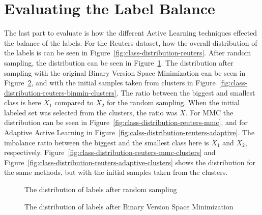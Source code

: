 \section{Evaluating the Label Balance}

The last part to evaluate is how the different Active Learning techniques effected the balance of the labels.
For the Reuters dataset, how the overall distribution of the labels is can be seen in Figure~\ref{fig:class-distribution-reuters}.
After random sampling, the distribution can be seen in Figure~\ref{fig:class-distribution-reuters-random}.
The distribution after sampling with the original Binary Version Space Minimization can be seen in Figure~\ref{fig:class-distribution-reuters-binmin}, and with the initial samples taken from clusters in Figure~\ref{fig:class-distribution-reuters-binmin-clusters}.
The ratio between the biggest and smallest class is here $X_1$ compared to $X_2$ for the random sampling.
When the initial labeled set was selected from the clusters, the ratio was $X$.
For MMC the distribution can be seen in Figure~\ref{fig:class-distribution-reuters-mmc}, and for Adaptive Active Learning in Figure~\ref{fig:calss-distribution-reuters-adaptive}.
The imbalance ratio between the biggest and the smallest class here is $X_1$ and $X_2$, respectively.
Figure~\ref{fig:class-distribution-reuters-mmc-clusters} and Figure~\ref{fig:class-distribution-reuters-adaptive-clusters} shows the distribution for the same methods, but with the initial samples taken from the clusters.

\begin{figure}
    \centering
    \caption{The distribution of labels after random sampling}
    \label{fig:class-distribution-reuters-random}
\end{figure}

\begin{figure}
    \centering
    \caption{The distribution of labels after Binary Version Space Minimization}
    \label{fig:class-distribution-reuters-binmin}
\end{figure}


